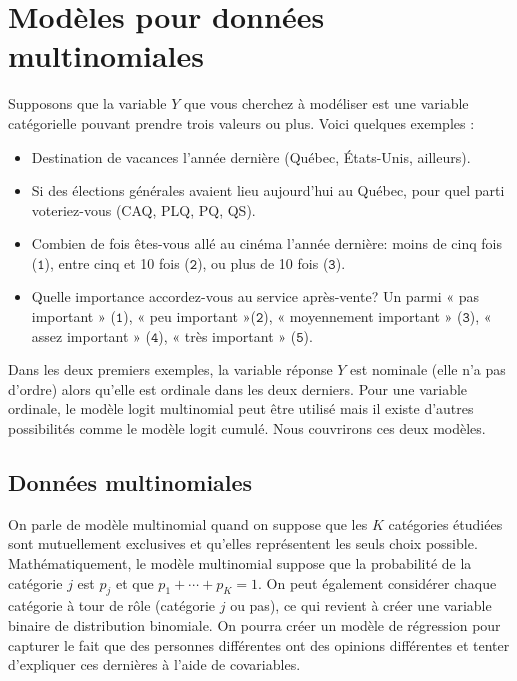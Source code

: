 \documentclass[
  11pt,
  letterpaper,
]{scrbook}
\providecommand{\tightlist}{%
  \setlength{\itemsep}{0pt}\setlength{\parskip}{0pt}}\usepackage{longtable,booktabs,array}
\theoremstyle{definition}
\theoremstyle{remark}
\begin{document}
\section{Modèles pour données
multinomiales}\label{moduxe8les-pour-donnuxe9es-multinomiales}

Supposons que la variable \(Y\) que vous cherchez à modéliser est une
variable catégorielle pouvant prendre trois valeurs ou plus. Voici
quelques exemples :

\begin{itemize}
\tightlist
\item
  Destination de vacances l'année dernière (Québec, États-Unis,
  ailleurs).
\item
  Si des élections générales avaient lieu aujourd'hui au Québec, pour
  quel parti voteriez-vous (CAQ, PLQ, PQ, QS).
\item
  Combien de fois êtes-vous allé au cinéma l'année dernière: moins de
  cinq fois (\(\texttt{1}\)), entre cinq et 10 fois (\(\texttt{2}\)), ou
  plus de 10 fois (\(\texttt{3}\)).
\item
  Quelle importance accordez-vous au service après-vente? Un parmi « pas
  important » (\(\texttt{1}\)), « peu important »(\(\texttt{2}\)), «
  moyennement important » (\(\texttt{3}\)), « assez important »
  (\(\texttt{4}\)), « très important » (\(\texttt{5}\)).
\end{itemize}

Dans les deux premiers exemples, la variable réponse \(Y\) est nominale
(elle n'a pas d'ordre) alors qu'elle est ordinale dans les deux
derniers. Pour une variable ordinale, le modèle logit multinomial peut
être utilisé mais il existe d'autres possibilités comme le modèle logit
cumulé. Nous couvrirons ces deux modèles.

\subsection{Données multinomiales}\label{donnuxe9es-multinomiales}

On parle de modèle multinomial quand on suppose que les \(K\) catégories
étudiées sont mutuellement exclusives et qu'elles représentent les seuls
choix possible. Mathématiquement, le modèle multinomial suppose que la
probabilité de la catégorie \(j\) est \(p_j\) et que
\(p_1 + \cdots + p_K=1\). On peut également considérer chaque catégorie
à tour de rôle (catégorie \(j\) ou pas), ce qui revient à créer une
variable binaire de distribution binomiale. On pourra créer un modèle de
régression pour capturer le fait que des personnes différentes ont des
opinions différentes et tenter d'expliquer ces dernières à l'aide de
covariables.
\end{document}
